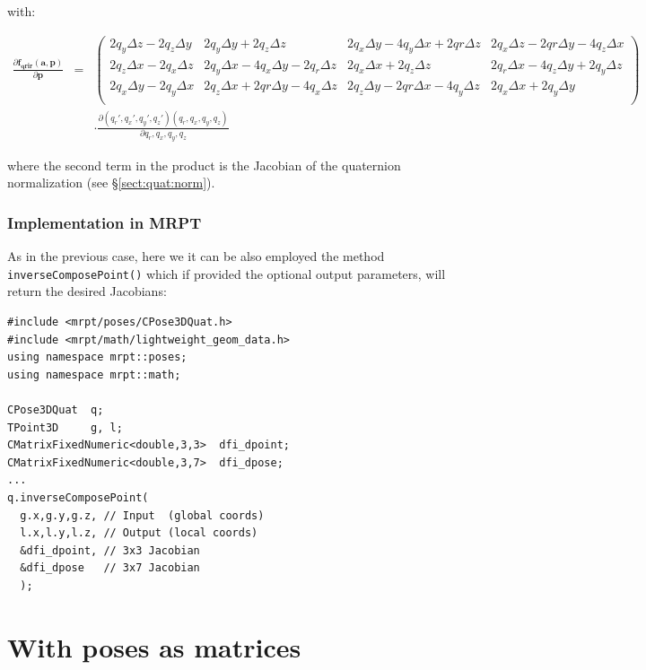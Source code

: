 \documentclass[a4paper,11pt]{report}
\begin{document}
\noindent with:

\begin{eqnarray}
\frac{ \partial \mathbf{f_{qrir}}( \mathbf{a}, \mathbf{p} )}{\partial \mathbf{p}}
&=&
\left(\begin{array}{cccc}
2 q_y \Delta z - 2 q_z \Delta y &                  2 q_y \Delta y + 2 q_z \Delta z &
2 q_x \Delta y - 4 q_y \Delta x + 2 qr \Delta z &  2 q_x \Delta z - 2 qr \Delta y - 4 q_z \Delta x
\\
 2 q_z \Delta x - 2 q_x \Delta z &  2 q_y \Delta x - 4 q_x \Delta y - 2 q_r \Delta z &
2 q_x \Delta x + 2 q_z \Delta z &  2 q_r \Delta x - 4 q_z \Delta y + 2 q_y \Delta z
\\
 2 q_x \Delta y - 2 q_y \Delta x &  2 q_z \Delta x + 2 qr \Delta y - 4 q_x \Delta z &
2 q_z \Delta y - 2 qr \Delta x - 4 q_y \Delta z &  2 q_x \Delta x + 2 q_y \Delta y
\\
\end{array}\right) \nonumber \\
& ~ & \cdot \frac{\partial (q_r',q_x',q_y',q_z')(q_r,q_x,q_y,q_z)}{\partial q_r,q_x,q_y,q_z}
\end{eqnarray}

\noindent where the second term in the product is the Jacobian of the quaternion
normalization (see \S \ref{sect:quat:norm}).



\subsubsection{Implementation in MRPT}

As in the previous case, here we it can be also employed the method
\texttt{inverseComposePoint()} which if provided the optional output parameters,
will return the desired Jacobians:

\begin{lstlisting}
#include <mrpt/poses/CPose3DQuat.h>
#include <mrpt/math/lightweight_geom_data.h>
using namespace mrpt::poses;
using namespace mrpt::math;

CPose3DQuat  q;
TPoint3D     g, l;
CMatrixFixedNumeric<double,3,3>  dfi_dpoint;
CMatrixFixedNumeric<double,3,7>  dfi_dpose;
...
q.inverseComposePoint(
  g.x,g.y,g.z, // Input  (global coords)
  l.x,l.y,l.z, // Output (local coords)
  &dfi_dpoint, // 3x3 Jacobian
  &dfi_dpose   // 3x7 Jacobian
  );
\end{lstlisting}



\section{With poses as matrices}
\label{sect:inv_comp_mat}
\end{document}
